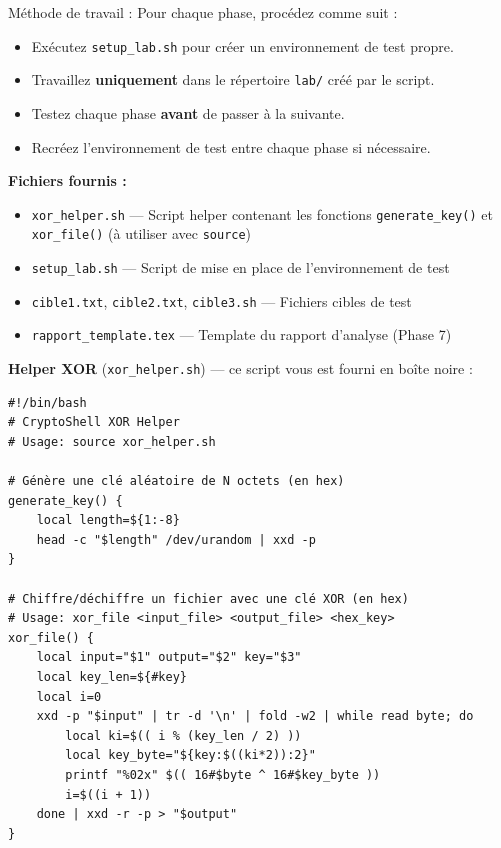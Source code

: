\documentclass[a4paper,11pt]{article}
\theoremstyle{plain}
\theoremstyle{definition}
\begin{document}
\bigskip

{\Large Méthode de travail :} Pour chaque phase, procédez comme suit :
\begin{itemize}
\item Exécutez \texttt{setup\_lab.sh} pour créer un environnement de test propre.
\item Travaillez \textbf{uniquement} dans le répertoire \texttt{lab/} créé par le script.
\item Testez chaque phase \textbf{avant} de passer à la suivante.
\item Recréez l'environnement de test entre chaque phase si nécessaire.
\end{itemize}

\medskip
\noindent\textbf{Fichiers fournis :}
\begin{itemize}
    \item \texttt{xor\_helper.sh} --- Script helper contenant les fonctions \texttt{generate\_key()} et \texttt{xor\_file()} (à utiliser avec \texttt{source})
    \item \texttt{setup\_lab.sh} --- Script de mise en place de l'environnement de test
    \item \texttt{cible1.txt}, \texttt{cible2.txt}, \texttt{cible3.sh} --- Fichiers cibles de test
    \item \texttt{rapport\_template.tex} --- Template du rapport d'analyse (Phase 7)
\end{itemize}

\medskip
\noindent\textbf{Helper XOR} (\texttt{xor\_helper.sh}) --- ce script vous est fourni en boîte noire :
\begin{lstlisting}[title=xor\_helper.sh (fourni)]
#!/bin/bash
# CryptoShell XOR Helper
# Usage: source xor_helper.sh

# Génère une clé aléatoire de N octets (en hex)
generate_key() {
    local length=${1:-8}
    head -c "$length" /dev/urandom | xxd -p
}

# Chiffre/déchiffre un fichier avec une clé XOR (en hex)
# Usage: xor_file <input_file> <output_file> <hex_key>
xor_file() {
    local input="$1" output="$2" key="$3"
    local key_len=${#key}
    local i=0
    xxd -p "$input" | tr -d '\n' | fold -w2 | while read byte; do
        local ki=$(( i % (key_len / 2) ))
        local key_byte="${key:$((ki*2)):2}"
        printf "%02x" $(( 16#$byte ^ 16#$key_byte ))
        i=$((i + 1))
    done | xxd -r -p > "$output"
}
\end{lstlisting}
\end{document}
